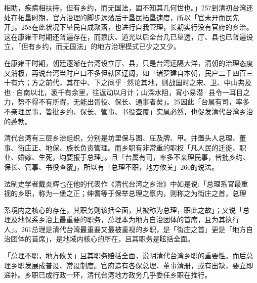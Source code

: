 相助，疾病相扶持，但有乡约，而无国法，固不知其几何世也。」257到清初台湾还处在拓垦时期，官方治理的脚步远落后于垦民拓垦速度，所以「官未开而民先开」。258在此状况下垦民自成聚落，也进行自我管理，长期实行没有官府的乡治。这在康雍干时期还普遍存在，而嘉庆、道光以后全台几已垦透，厅、县也已普遍设立，「但有乡约，而无国法」的地方治理模式已少之又少。

在康雍干时期，朝廷逐渐在台湾设立厅、县，只是台湾远隔大洋，清朝的治理态度又消极，再说台湾当时户口不多但辖区辽阔，如「诸罗建自本朝，民户二千四百三十有六；方之前代，其在中、下之间乎·然论其地，则战国时之宋、卫、中山弗及也·自南以北，袤千有余里，往返动以月计；山深水阻，宵小易潜·县令一耳目之力，势不得不有所寄，无能出胥役、保长、通事者矣」。25因此「台属有司，率多不亲理民事，皆批乡约、保长、管事、书役查覆」实属必然，也促发清代台湾乡治的蓬勃。

清代台湾有三层乡治组织，分别是坊里保与图、庄及牌、甲。并置头人总理、董事、街庄正、地保、族长负责管理。而乡职有非常重的职权「凡人民的迁徙、职业、婚嫁、生死，均要报于总理」。且「台属有司，率多不亲理民事，皆批乡约、保长、管事、书役查覆」，所以有「总理不职，地方攸关」260的说法。

法制史学者戴炎辉也在他的代表作《清代台湾之乡治》中如是说:「总理系官最重视的乡职，称为一堡之正；绅耆等于保举总理之禀内，则称之为街庄之首，总理

\vfill
\begin{BookNotes}
\end{BookNotes}

\noindent 系境内之核心的存在，其职务则该括全面，其被称为总理，职此之故」；又说「总理及地保系乡治上最重要的职务，总理本为地方自治团体的首席，且为其执行人」。261总理是清代台湾最重要又最被重视的乡职，是「街庄之首」更是「地方自治团体的首席」，是地域内核心的所在，且其职务是眩括全面。

「总理不职，地方攸关」且其职务赔括全面，说明清代台湾乡职的重要性。而后总理乡职发展成普设、常设制度。官府造有各保总理、董事清册，或有出缺，要立即递补。乡职已成行政一环，清代台湾地方政务几乎委任乡职在推行。

\vfill
\begin{BookNotes}
\end{BookNotes}
